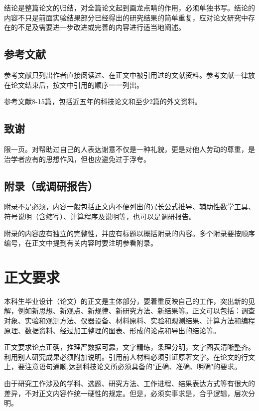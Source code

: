 \documentclass[
	StudentName     = 姓名,
	StudentID       = 学号,
	AdvisorName     = 指导教师,
	Grade           = 年级,
	Major           = 专业,
	Department      = 一个很长很长的名字,
	SubmitYear		= 2022,
	SubmitMonth		= 5,
	Title           = 论文中文题目,
	TitleEng        = {{English Title}}
]{cauc_thesis}
\begin{document}
	结论是整篇论文的归结，对全篇论文起到画龙点睛的作用，必须单独书写。结论的内容不只是前面实验结果部分已经得出的研究结果的简单重复，应对论文研究中存在的不足及需要进一步改进或完善的内容进行适当地阐述。
	
	\section{参考文献}
	
	参考文献只列出作者直接阅读过、在正文中被引用过的文献资料。参考文献一律放在论文结束后，按文中引用的顺序一一列出。
	
	参考文献8-15篇，包括近五年的科技论文和至少2篇的外文资料。
	\section{致谢}
	
	限一页。对帮助过自己的人表达谢意不仅是一种礼貌，更是对他人劳动的尊重，是治学者应有的思想作风，但也应避免过于浮夸。
	
	\section{附录（或调研报告）}
	
	附录不是必须，内容一般包括正文内不便列出的冗长公式推导、辅助性数学工具、符号说明（含缩写）、计算程序及说明等，也可以是调研报告。
	
	附录的内容应有独立的完整性，并应有标题以概括附录的内容。多个附录要按顺序编号，在正文中提到有关内容时要注明参看附录。
	
	{\centering\chapter{正文要求}}
	
	本科生毕业设计（论文）的正文是主体部分，要着重反映自己的工作，突出新的见解，例如新思想、新观点、新规律、新研究方法、新结果等。正文可以包括：调查对象、实验和观测方法、仪器设备、材料原料、实验和观测结果、计算方法和编程原理、数据资料、经过加工整理的图表、形成的论点和导出的结论等。
	
	正文要求论点正确，推理严数据可靠，文字精练，条理分明，文字图表清晰整齐。利用别人研究成果必须附加说明。引用前人材料必须引证原著文字。在论文的行文上，要注意语句通顺,达到科技论文所必须具备的"正确、准确、明确"的要求。
	
	由于研究工作涉及的学科、选题、研究方法、工作进程、结果表达方式等有很大的差异，不对正文内容作统一硬性的规定。但是，必须实事求是，合乎逻辑，层次分明。
	
\end{document}
